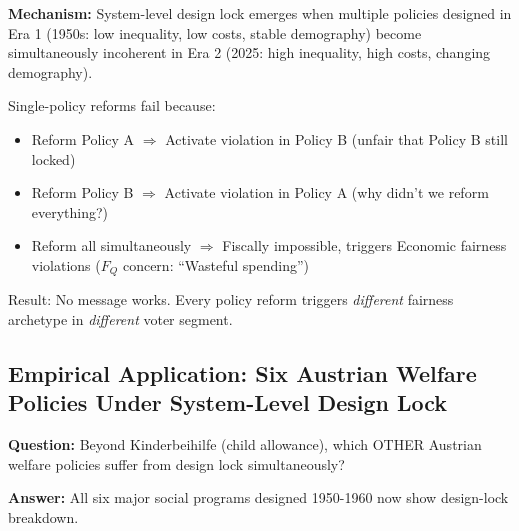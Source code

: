\vspace{0.5em}

\textbf{Mechanism:} System-level design lock emerges when multiple policies designed in Era 1
(1950s: low inequality, low costs, stable demography) become simultaneously incoherent in Era 2
(2025: high inequality, high costs, changing demography).

Single-policy reforms fail because:
\begin{itemize}[nosep]
\item Reform Policy A $\Rightarrow$ Activate violation in Policy B (unfair that Policy B still locked)
\item Reform Policy B $\Rightarrow$ Activate violation in Policy A (why didn't we reform everything?)
\item Reform all simultaneously $\Rightarrow$ Fiscally impossible, triggers Economic fairness violations ($F_Q$ concern: ``Wasteful spending'')
\end{itemize}

Result: No message works. Every policy reform triggers \textit{different} fairness archetype in
\textit{different} voter segment.

\subsection{Empirical Application: Six Austrian Welfare Policies Under System-Level Design Lock}

\textbf{Question:} Beyond Kinderbeihilfe (child allowance), which OTHER Austrian welfare policies
suffer from design lock simultaneously?

\textbf{Answer:} All six major social programs designed 1950-1960 now show design-lock breakdown.


